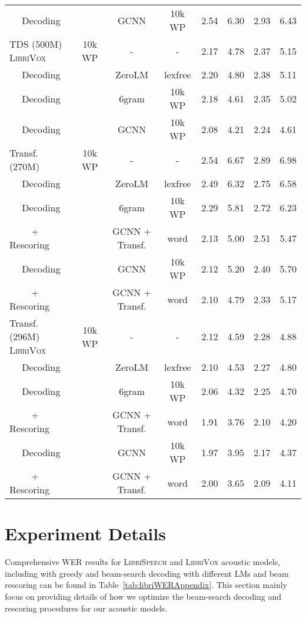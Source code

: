 \documentclass{article}
\newcommand{\librivox}{\textsc{LibriVox}}
\newcommand{\librispeech}{\textsc{LibriSpeech}}
\begin{document}
\begin{table*}[!t]
\begin{small}
\begin{sc}
\begin{tabular}{lccccccc}
    ~~ Decoding & & GCNN & 10k WP & 2.54 & 6.30 & 2.93 & 6.43 \\
TDS (500M) \librivox~& 10k WP & - & - & 2.17 & 4.78 & 2.37 & 5.15 \\
    ~~ Decoding & & ZeroLM & lexfree & 2.20 & 4.80 & 2.38 & 5.11 \\
    ~~ Decoding & & 6gram & 10k WP & 2.18 & 4.61 & 2.35 & 5.02 \\
    ~~ Decoding & & GCNN & 10k WP & 2.08 & 4.21 & 2.24 & 4.61 \\
    \cmidrule(lr){1-1}
    Transf. (270M) & 10k WP & - & - & 2.54 & 6.67 & 2.89 & 6.98 \\
    ~~ Decoding & & ZeroLM & lexfree & 2.49 & 6.32 & 2.75 & 6.58 \\
    ~~ Decoding & & 6gram & 10k WP & 2.29 & 5.81 & 2.72 & 6.23 \\
    ~~~~ + Rescoring &  & GCNN + Transf. & word & 2.13 & 5.00 & 2.51 & 5.47 \\
    ~~ Decoding & & GCNN & 10k WP & 2.12 & 5.20 & 2.40 & 5.70 \\
    ~~~~ + Rescoring &  & GCNN + Transf. & word & 2.10 & 4.79 & 2.33 & 5.17 \\
Transf. (296M) \librivox~& 10k WP & - & - & 2.12 & 4.59 & 2.28 & 4.88 \\
    ~~ Decoding & & ZeroLM & lexfree & 2.10 & 4.53 & 2.27 & 4.80  \\
    ~~ Decoding & & 6gram & 10k WP & 2.06 & 4.32 & 2.25 & 4.70 \\
    ~~~~ + Rescoring &  & GCNN + Transf. & word & 1.91 & 3.76 & 2.10 & 4.20 \\
    ~~ Decoding & & GCNN & 10k WP & 1.97 & 3.95 & 2.17 & 4.37 \\
    ~~~~ + Rescoring &  & GCNN + Transf. & word & 2.00 & 3.65 & 2.09 & 4.11 \\
    \bottomrule
    \end{tabular}
    \end{sc}
\end{small}
\end{table*}


\clearpage

\section{Experiment Details}
Comprehensive WER results for \librispeech{} and \librivox{} acoustic models, including with greedy and beam-search decoding with different LMs and beam rescoring can be found in Table~\ref{tab:libriWERAppendix}. This section mainly focus on providing details of how we optimize the beam-search decoding and rescoring procedures for our acoustic models. 
\end{document}
